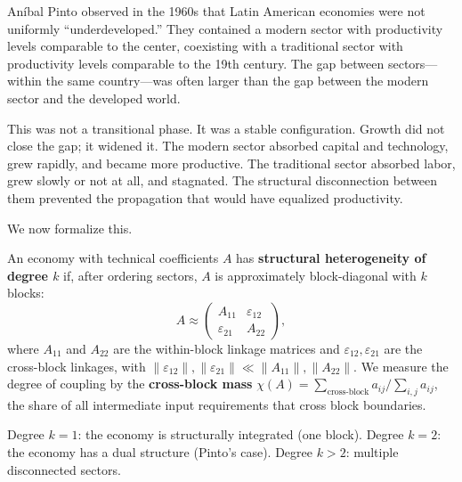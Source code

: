 \documentclass[../structural_economics_book.tex]{subfiles}
\begin{document}
An\'{i}bal Pinto observed in the 1960s that Latin American economies were not uniformly ``underdeveloped.'' They contained a modern sector with productivity levels comparable to the center, coexisting with a traditional sector with productivity levels comparable to the 19th century. The gap between sectors---within the same country---was often larger than the gap between the modern sector and the developed world.

This was not a transitional phase. It was a stable configuration. Growth did not close the gap; it widened it. The modern sector absorbed capital and technology, grew rapidly, and became more productive. The traditional sector absorbed labor, grew slowly or not at all, and stagnated. The structural disconnection between them prevented the propagation that would have equalized productivity.

We now formalize this.

\begin{definition}\label{ch03:def:heterogeneity}
An economy with technical coefficients $A$ has \textbf{structural heterogeneity of degree $k$} if, after ordering sectors, $A$ is approximately block-diagonal with $k$ blocks:
\begin{equation}\label{ch03:eq:block_diagonal}
A \approx \begin{pmatrix} A_{11} & \varepsilon_{12} \\ \varepsilon_{21} & A_{22} \end{pmatrix},
\end{equation}
where $A_{11}$ and $A_{22}$ are the within-block linkage matrices and $\varepsilon_{12}, \varepsilon_{21}$ are the cross-block linkages, with $\|\varepsilon_{12}\|, \|\varepsilon_{21}\| \ll \|A_{11}\|, \|A_{22}\|$. We measure the degree of coupling by the \textbf{cross-block mass} $\chi(A) = \sum_{\text{cross-block}} a_{ij} / \sum_{i,j} a_{ij}$, the share of all intermediate input requirements that cross block boundaries.

Degree $k = 1$: the economy is structurally integrated (one block). Degree $k = 2$: the economy has a dual structure (Pinto's case). Degree $k > 2$: multiple disconnected sectors.
\end{definition}
\end{document}
